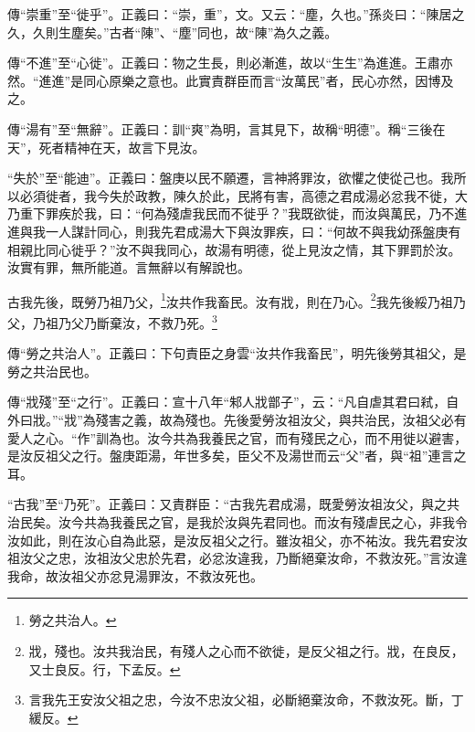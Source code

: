 {\noindent\zhuan{}\fzbyks 傳“崇重”至“徙乎”。正義曰：“崇，重”，文。又云：“塵，久也。”孫炎曰：“陳居之久，久則生塵矣。”古者“陳”、“塵”同也，故“陳”為久之義。 \par}

{\noindent\zhuan{}\fzbyks 傳“不進”至“心徙”。正義曰：物之生長，則必漸進，故以“生生”為進進。王肅亦然。“進進”是同心原樂之意也。此實責群臣而言“汝萬民”者，民心亦然，因博及之。 \par}

{\noindent\zhuan{}\fzbyks 傳“湯有”至“無辭”。正義曰：訓“爽”為明，言其見下，故稱“明德”。稱“三後在天”，死者精神在天，故言下見汝。 \par}

{\noindent\shu{}\fzkt “失於”至“能迪”。正義曰：盤庚以民不願遷，言神將罪汝，欲懼之使從己也。我所以必須徙者，我今失於政教，陳久於此，民將有害，高德之君成湯必忿我不徙，大乃重下罪疾於我，曰：“何為殘虐我民而不徙乎？”我既欲徙，而汝與萬民，乃不進進與我一人謀計同心，則我先君成湯大下與汝罪疾，曰：“何故不與我幼孫盤庚有相親比同心徙乎？”汝不與我同心，故湯有明德，從上見汝之情，其下罪罰於汝。汝實有罪，無所能道。言無辭以有解說也。 \par}

古我先後，既勞乃祖乃父，\footnote{勞之共治人。}汝共作我畜民。汝有戕，則在乃心。\footnote{戕，殘也。汝共我治民，有殘人之心而不欲徙，是反父祖之行。戕，在良反，又士良反。行，下孟反。}我先後綏乃祖乃父，乃祖乃父乃斷棄汝，不救乃死。\footnote{言我先王安汝父祖之忠，今汝不忠汝父祖，必斷絕棄汝命，不救汝死。斷，丁緩反。}

{\noindent\zhuan{}\fzbyks 傳“勞之共治人”。正義曰：下句責臣之身雲“汝共作我畜民”，明先後勞其祖父，是勞之共治民也。 \par}

{\noindent\zhuan{}\fzbyks 傳“戕殘”至“之行”。正義曰：宣十八年“邾人戕鄫子”，云：“凡自虐其君曰弒，自外曰戕。”“戕”為殘害之義，故為殘也。先後愛勞汝祖汝父，與共治民，汝祖父必有愛人之心。“作”訓為也。汝今共為我養民之官，而有殘民之心，而不用徙以避害，是汝反祖父之行。盤庚距湯，年世多矣，臣父不及湯世而云“父”者，與“祖”連言之耳。 \par}

{\noindent\shu{}\fzkt “古我”至“乃死”。正義曰：又責群臣：“古我先君成湯，既愛勞汝祖汝父，與之共治民矣。汝今共為我養民之官，是我於汝與先君同也。而汝有殘虐民之心，非我令汝如此，則在汝心自為此惡，是汝反祖父之行。雖汝祖父，亦不祐汝。我先君安汝祖汝父之忠，汝祖汝父忠於先君，必忿汝違我，乃斷絕棄汝命，不救汝死。”言汝違我命，故汝祖父亦忿見湯罪汝，不救汝死也。 \par}

